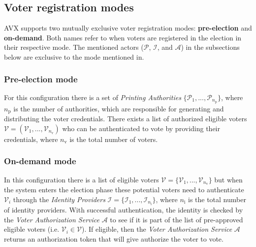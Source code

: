 \subsection{Voter registration modes} \label{sec: voter registration modes}
AVX supports two mutually exclusive voter registration modes: \textbf{pre-election} and \textbf{on-demand}. Both names refer to when voters are registered in the election in their respective mode. The mentioned actors ($\mathcal{P}$, $\mathcal{I}$, and $\mathcal{A}$) in the subsections below are exclusive to the mode mentioned in.


\subsubsection{Pre-election mode} \label{sec: pre-election mode}
For this configuration there is a set of \textit{Printing Authorities} $\{\mathcal{P}_1, ..., \mathcal{P}_{n_\mathrm{p}}\}$, where $n_\mathrm{p}$ is the number of authorities, which are responsible for generating and distributing the voter credentials. There exists a list of authorized eligible voters \( \boldsymbol{\mathcal{V}} = (\mathcal{V}_1, ..., \mathcal{V}_{n_\mathrm{v}}) \) who can be authenticated to vote by providing their credentials, where $n_\mathrm{v}$ is the total number of voters.


\subsubsection{On-demand mode} \label{sec: on-demand mode}
In this configuration there is a list of eligible voters \( \boldsymbol{\mathcal{V}} = \{\mathcal{V}_1, ..., \mathcal{V}_{n_\mathrm{v}}\} \) but when the system enters the election phase these potential voters need to authenticate $\mathcal{V}_i$ through the \textit{Identity Providers} $\boldsymbol{\mathcal{I}} = \{\mathcal{I}_1, ..., \mathcal{I}_{n_\mathrm{i}}\}$, where $n_\mathrm{i}$ is the total number of identity providers. With successful authentication, the identity is checked by the \textit{Voter Authorization Service} $\mathcal{A}$ to see if it is part of the list of pre-approved eligible voters (i.e. $\mathcal{V}_i \in \boldsymbol{\mathcal{V}}$). If eligible, then the \textit{Voter Authorization Service} $\mathcal{A}$ returns an authorization token that will give authorize the voter to vote.
